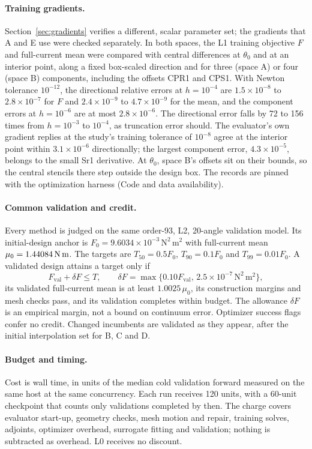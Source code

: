 \paragraph{Training gradients.}
Section~\ref{sec:gradients} verifies a different, scalar parameter set; the
gradients that A and E use were checked separately. In both spaces, the L1
training objective $F$ and full-current mean were compared with central
differences at $\theta_0$ and at an interior point, along a fixed
box-scaled direction and for three (space A) or four (space B) components,
including the offsets CPR1 and CPS1. With Newton tolerance $10^{-12}$, the
directional relative errors at $h=10^{-4}$ are $1.5\times10^{-8}$ to
$2.8\times10^{-7}$ for $F$ and $2.4\times10^{-9}$ to $4.7\times10^{-9}$ for
the mean, and the component errors at $h=10^{-6}$ are at most
$2.8\times10^{-6}$. The directional error falls by 72 to 156 times from
$h=10^{-3}$ to $10^{-4}$, as truncation error should. The evaluator's own
gradient replies at the study's training tolerance of $10^{-8}$ agree at
the interior point within $3.1\times10^{-6}$ directionally; the largest
component error, $4.3\times10^{-5}$, belongs to the small Sr1 derivative.
At $\theta_0$, space B's offsets sit on their bounds, so the central
stencils there step outside the design box. The records are pinned with the
optimization harness (Code and data availability).

\paragraph{Common validation and credit.}
Every method is judged on the same order-93, L2, 20-angle validation model.
Its initial-design anchor is $F_0=9.6034\times10^{-3}\,\mathrm{N^2\,m^2}$ with
full-current mean $\mu_0=1.44084\,\mathrm{N\,m}$. The targets are $T_{50}=0.5F_0$,
$T_{90}=0.1F_0$ and $T_{99}=0.01F_0$. A validated design attains a target
only if
\begin{equation}
 F_{\mathrm{val}}+\delta F\leq T,\qquad
 \delta F=\max\{0.10F_{\mathrm{val}},\,2.5\times10^{-7}\,\mathrm{N^2\,m^2}\},
\end{equation}
its validated full-current mean is at least $1.0025\,\mu_0$, its
construction margins and mesh checks pass, and its validation completes
within budget. The allowance $\delta F$ is an empirical margin, not a bound
on continuum error. Optimizer success flags confer no credit. Changed
incumbents are validated as they appear, after the initial interpolation
set for B, C and D.

\paragraph{Budget and timing.}
Cost is wall time, in units of the median cold validation forward measured
on the same host at the same concurrency. Each run receives 120 units,
with a 60-unit checkpoint that counts only validations completed by then.
The charge covers evaluator start-up, geometry checks, mesh motion and
repair, training solves, adjoints, optimizer overhead, surrogate fitting
and validation; nothing is subtracted as overhead. L0 receives no discount.

